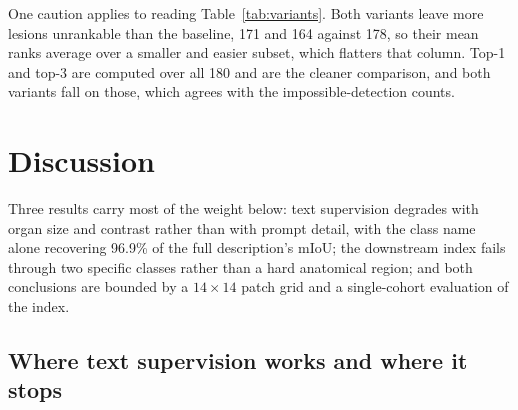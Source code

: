 \documentclass[10pt]{article}
\begin{document}
One caution applies to reading Table~\ref{tab:variants}. Both variants leave more
lesions unrankable than the baseline, 171 and 164 against 178, so their mean ranks
average over a smaller and easier subset, which flatters that column. Top-1 and
top-3 are computed over all 180 and are the cleaner comparison, and both variants
fall on those, which agrees with the impossible-detection counts.

\section{Discussion}
\label{sec:discussion}

Three results carry most of the weight below: text supervision degrades with
organ size and contrast rather than with prompt detail, with the class name alone
recovering 96.9\% of the full description's mIoU; the downstream index fails
through two specific classes rather than a hard anatomical region; and both
conclusions are bounded by a $14\times14$ patch grid and a single-cohort
evaluation of the index.

\subsection{Where text supervision works and where it stops}
\end{document}
